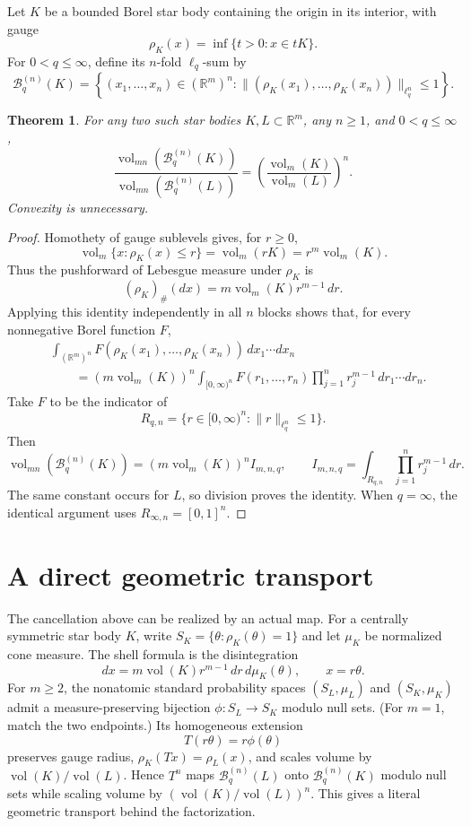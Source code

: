 \documentclass[11pt]{article}
\newtheorem{theorem}{Theorem}
\newcommand{\vol}{\operatorname{vol}}
\newcommand{\R}{\mathbb R}
\begin{document}
Let $K$ be a bounded Borel star body containing the origin in its interior,
with gauge
\[
 \rho_K(x)=\inf\{t>0:x\in tK\}.
\]
For $0<q\le\infty$, define its $n$-fold $\ell_q$-sum by
\[
 \mathcal B_q^{(n)}(K)=
 \left\{(x_1,\ldots,x_n)\in(\R^m)^n:
 \|(\rho_K(x_1),\ldots,\rho_K(x_n))\|_{\ell_q^n}\le1\right\}.
\]

\begin{theorem}\label{ratio-theorem}
For any two such star bodies $K,L\subset\R^m$, any $n\ge1$, and
$0<q\le\infty$,
\[
 \frac{\vol_{mn}(\mathcal B_q^{(n)}(K))}
      {\vol_{mn}(\mathcal B_q^{(n)}(L))}
 =\left(\frac{\vol_m(K)}{\vol_m(L)}\right)^n.
\]
Convexity is unnecessary.
\end{theorem}

\begin{proof}
Homothety of gauge sublevels gives, for $r\ge0$,
\[
 \vol_m\{x:\rho_K(x)\le r\}=\vol_m(rK)=r^m\vol_m(K).
\]
Thus the pushforward of Lebesgue measure under $\rho_K$ is
\[
 (\rho_K)_\#(dx)=m\vol_m(K)r^{m-1}\,dr.
\]
Applying this identity independently in all $n$ blocks shows that, for every
nonnegative Borel function $F$,
\begin{align*}
 &\int_{(\R^m)^n}F(\rho_K(x_1),\ldots,\rho_K(x_n))\,dx_1\cdots dx_n\\
 &\qquad=(m\vol_m(K))^n
 \int_{[0,\infty)^n}F(r_1,\ldots,r_n)
 \prod_{j=1}^n r_j^{m-1}\,dr_1\cdots dr_n.
\end{align*}
Take $F$ to be the indicator of
\[
 R_{q,n}=\{r\in[0,\infty)^n:\|r\|_{\ell_q^n}\le1\}.
\]
Then
\[
 \vol_{mn}(\mathcal B_q^{(n)}(K))
 =(m\vol_m(K))^n I_{m,n,q},
 \qquad
 I_{m,n,q}=\int_{R_{q,n}}\prod_{j=1}^n r_j^{m-1}\,dr.
\]
The same constant occurs for $L$, so division proves the identity.  When
$q=\infty$, the identical argument uses $R_{\infty,n}=[0,1]^n$.
\end{proof}

\section*{A direct geometric transport}
The cancellation above can be realized by an actual map.  For a centrally
symmetric star body $K$, write
$S_K=\{\theta:\rho_K(\theta)=1\}$ and let $\mu_K$ be normalized cone measure.
The shell formula is the disintegration
\[
 dx=m\vol(K)r^{m-1}\,dr\,d\mu_K(\theta),\qquad x=r\theta.
\]
For $m\ge2$, the nonatomic standard probability spaces
$(S_L,\mu_L)$ and $(S_K,\mu_K)$ admit a measure-preserving bijection
$\phi:S_L\to S_K$ modulo null sets.  (For $m=1$, match the two endpoints.)
Its homogeneous extension
\[
 T(r\theta)=r\phi(\theta)
\]
preserves gauge radius, $\rho_K(Tx)=\rho_L(x)$, and scales volume by
$\vol(K)/\vol(L)$.  Hence $T^n$ maps
$\mathcal B_q^{(n)}(L)$ onto $\mathcal B_q^{(n)}(K)$ modulo null sets while
scaling volume by $(\vol(K)/\vol(L))^n$.  This gives a literal geometric
transport behind the factorization.
\end{document}
